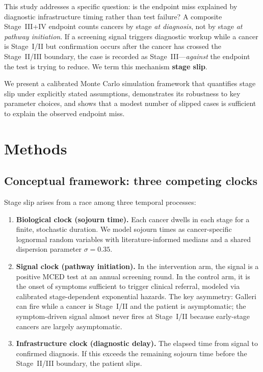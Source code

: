 \documentclass[11pt,letter]{article}
\begin{document}
This study addresses a specific question: is the endpoint miss explained by
diagnostic infrastructure timing rather than test failure? A composite
Stage~III+IV endpoint counts cancers by stage \emph{at diagnosis}, not by
stage \emph{at pathway initiation}. If a screening signal triggers
diagnostic workup while a cancer is Stage~I/II but confirmation occurs
after the cancer has crossed the Stage~II/III boundary, the case is
recorded as Stage~III---\emph{against} the endpoint the test is trying to
reduce. We term this mechanism \textbf{stage slip}.

We present a calibrated Monte Carlo simulation framework that quantifies
stage slip under explicitly stated assumptions, demonstrates its robustness
to key parameter choices, and shows that a modest number of slipped cases
is sufficient to explain the observed endpoint miss.


\section{Methods}
\label{sec:methods}

\subsection{Conceptual framework: three competing clocks}

Stage slip arises from a race among three temporal processes:

\begin{enumerate}[label=(\alph*)]
\item \textbf{Biological clock (sojourn time).} Each cancer dwells in each
  stage for a finite, stochastic duration. We model sojourn times as
  cancer-specific lognormal random variables with literature-informed
  medians and a shared dispersion parameter $\sigma = 0.35$.

\item \textbf{Signal clock (pathway initiation).} In the intervention arm,
  the signal is a positive MCED test at an annual screening round. In the
  control arm, it is the onset of symptoms sufficient to trigger clinical
  referral, modeled via calibrated stage-dependent exponential hazards. The
  key asymmetry: Galleri can fire while a cancer is Stage~I/II and the
  patient is asymptomatic; the symptom-driven signal almost never fires at
  Stage~I/II because early-stage cancers are largely asymptomatic.

\item \textbf{Infrastructure clock (diagnostic delay).} The elapsed time
  from signal to confirmed diagnosis. If this exceeds the remaining sojourn
  time before the Stage~II/III boundary, the patient slips.
\end{enumerate}
\end{document}
